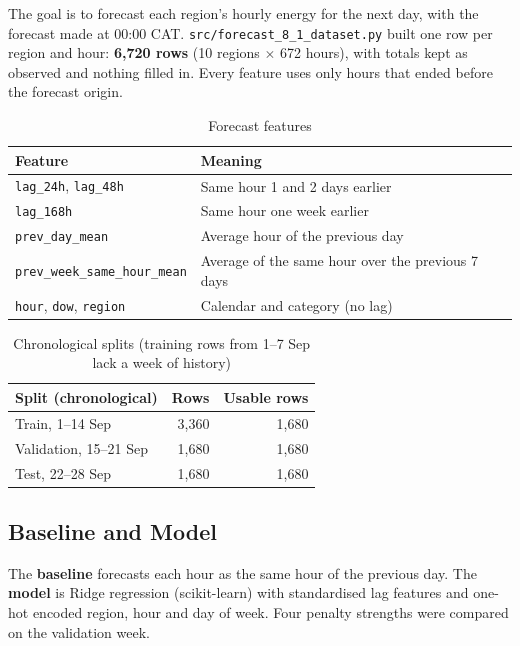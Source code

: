 \documentclass[11pt,a4paper]{article}
\begin{document}
The goal is to forecast each region's hourly energy for the next day, with the forecast made at 00:00 CAT. \texttt{src/forecast\_8\_1\_dataset.py} built one row per region and hour: \textbf{6,720 rows} (10 regions $\times$ 672 hours), with totals kept as observed and nothing filled in. Every feature uses only hours that ended before the forecast origin.

\begin{table}[H]
\centering
\begin{tabular}{ll}
\toprule
\textbf{Feature} & \textbf{Meaning} \\
\midrule
\texttt{lag\_24h}, \texttt{lag\_48h} & Same hour 1 and 2 days earlier \\
\texttt{lag\_168h} & Same hour one week earlier \\
\texttt{prev\_day\_mean} & Average hour of the previous day \\
\texttt{prev\_week\_same\_hour\_mean} & Average of the same hour over the previous 7 days \\
\texttt{hour}, \texttt{dow}, \texttt{region} & Calendar and category (no lag) \\
\bottomrule
\end{tabular}
\caption{Forecast features}
\end{table}

\begin{table}[H]
\centering
\begin{tabular}{lrr}
\toprule
\textbf{Split (chronological)} & \textbf{Rows} & \textbf{Usable rows} \\
\midrule
Train, 1--14 Sep & 3,360 & 1,680 \\
Validation, 15--21 Sep & 1,680 & 1,680 \\
Test, 22--28 Sep & 1,680 & 1,680 \\
\bottomrule
\end{tabular}
\caption{Chronological splits (training rows from 1--7 Sep lack a week of history)}
\end{table}

\subsection{Baseline and Model}

The \textbf{baseline} forecasts each hour as the same hour of the previous day. The \textbf{model} is Ridge regression (scikit-learn) with standardised lag features and one-hot encoded region, hour and day of week. Four penalty strengths were compared on the validation week.
\end{document}

